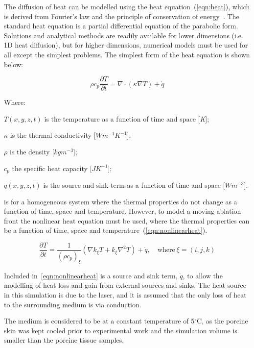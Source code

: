 The diffusion of heat can be modelled using the heat equation~(\cref{eqn:heat}), which is derived from Fourier's law and the principle of conservation of energy~\cite{widder1976heat}.  The standard heat equation is a partial differential equation of the parabolic form. Solutions and analytical methods are readily available for lower dimensions (i.e. 1D heat diffusion), but for higher dimensions, numerical models must be used for all except the simplest problems. The simplest form of the heat equation is shown below:

\begin{equation}
\rho c_p \frac{\partial T}{\partial t}= \nabla \cdot (\kappa \nabla T) + \dot{q}
\label{eqn:heat}
\end{equation}

\noindent Where:

	\indent $T(x, y, z, t)$ is the temperature as a function of time and space [\textit{K}];
	
	\indent $\kappa$ is the thermal conductivity [$W m^{-1} K^{-1}$];
	
	\indent $\rho$ is the density [$kg  m^{-3}$];
	
	\indent $c_p$ the specific heat capacity [$J K^{-1}$];
	
	\indent $\dot{q}(x,y,z,t)$ is the source and sink term as a function of time and space [$W m^{-3}$].
	
	\medskip

 is for a homogeneous system where the thermal properties do not change as a function of time, space and temperature. However, to model a moving ablation front the nonlinear heat equation must be used, where the thermal properties can be a function of time, space and temperature~(\cref{eqn:nonlinearheat}).

\begin{equation}
\frac{\partial T}{\partial t} = \frac{1}{(\rho c_p)_{\xi}}(\nabla k_\xi T + k_\xi\nabla^2T)+\dot{q},\quad \text{where}\ \xi=(i,j,k)
\label{eqn:nonlinearheat}
\end{equation}

Included in~\cref{eqn:nonlinearheat} is a source and sink term, $\dot{q}$, to allow the modelling of heat loss and gain from external sources and sinks. The heat source in this simulation is due to the laser, and it is assumed that the only loss of heat to the surrounding medium is via conduction.
	
The medium is considered to be at a constant temperature of 5$^{\circ}$C, as the porcine skin was kept cooled prior to experimental work and the simulation volume is smaller than the porcine tissue samples. 

